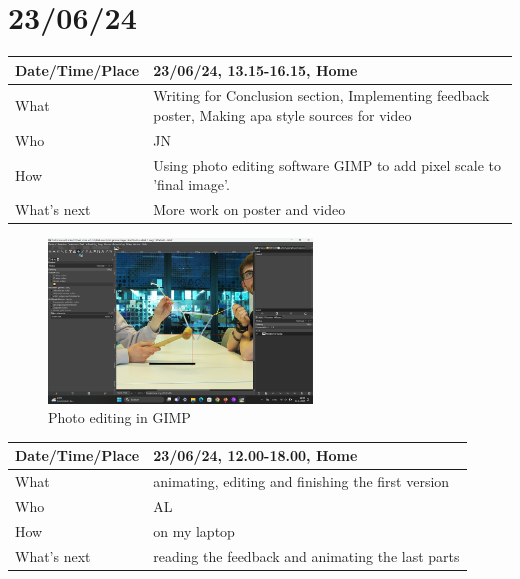 \documentclass{article}
\begin{document}
\section{23/06/24}

\begin{table}[H]
\begin{tabular}{|p{1.5in}|p{4in}|}
\hline
Date/Time/Place & 23/06/24, 13.15-16.15, Home \\ \hline
What            & Writing for Conclusion section, Implementing feedback poster, Making apa style sources for video  \\ \hline
Who             & JN \\ \hline
How             & Using photo editing software GIMP to add pixel scale to 'final image'.  \\ \hline
What's next     &  More work on poster and video\\ \hline
\end{tabular}
\end{table}

\begin{figure}[H]
    \centering
    \includegraphics[width=7cm]{Editen in GIMP.png}
    \caption{Photo editing in GIMP}   
\end{figure}

\begin{table}[H]
\begin{tabular}{|p{1.5in}|p{4in}|}
\hline
Date/Time/Place &  23/06/24, 12.00-18.00, Home\\ \hline
What            &  animating, editing and finishing the first version \\ \hline
Who             &  AL\\ \hline
How             &  on my laptop\\ \hline
What's next     &  reading the feedback and animating the last parts\\ \hline
\end{tabular}
\end{table}
\end{document}
